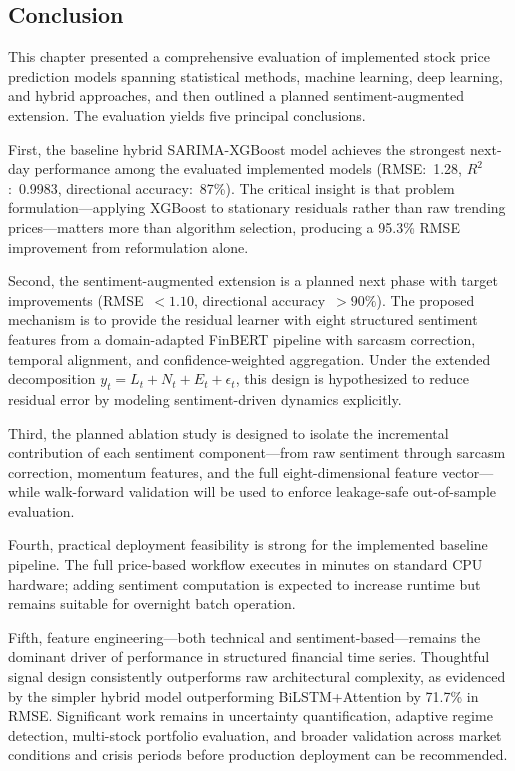 \subsection{Conclusion}

This chapter presented a comprehensive evaluation of implemented stock price prediction models spanning statistical methods, machine learning, deep learning, and hybrid approaches, and then outlined a planned sentiment-augmented extension. The evaluation yields five principal conclusions.

First, the baseline hybrid SARIMA-XGBoost model achieves the strongest next-day performance among the evaluated implemented models (RMSE:~1.28, $R^2$:~0.9983, directional accuracy:~87\%). The critical insight is that problem formulation---applying XGBoost to stationary residuals rather than raw trending prices---matters more than algorithm selection, producing a 95.3\% RMSE improvement from reformulation alone.

Second, the sentiment-augmented extension is a planned next phase with target improvements (RMSE~$< 1.10$, directional accuracy~$> 90\%$). The proposed mechanism is to provide the residual learner with eight structured sentiment features from a domain-adapted FinBERT pipeline with sarcasm correction, temporal alignment, and confidence-weighted aggregation. Under the extended decomposition $y_t = L_t + N_t + E_t + \epsilon_t$, this design is hypothesized to reduce residual error by modeling sentiment-driven dynamics explicitly.

Third, the planned ablation study is designed to isolate the incremental contribution of each sentiment component---from raw sentiment through sarcasm correction, momentum features, and the full eight-dimensional feature vector---while walk-forward validation will be used to enforce leakage-safe out-of-sample evaluation.

Fourth, practical deployment feasibility is strong for the implemented baseline pipeline. The full price-based workflow executes in minutes on standard CPU hardware; adding sentiment computation is expected to increase runtime but remains suitable for overnight batch operation.

Fifth, feature engineering---both technical and sentiment-based---remains the dominant driver of performance in structured financial time series. Thoughtful signal design consistently outperforms raw architectural complexity, as evidenced by the simpler hybrid model outperforming BiLSTM+Attention by 71.7\% in RMSE. Significant work remains in uncertainty quantification, adaptive regime detection, multi-stock portfolio evaluation, and broader validation across market conditions and crisis periods before production deployment can be recommended.
